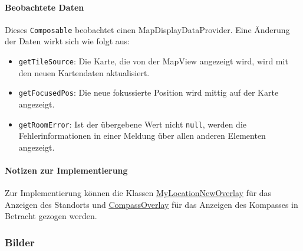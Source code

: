 \paragraph*{Beobachtete Daten}
Dieses \texttt{Composable} beobachtet einen MapDisplayDataProvider. 
Eine Änderung der Daten wirkt sich wie folgt aus:
\begin{itemize}
    \item \texttt{getTileSource}: Die Karte, die von der MapView angezeigt wird, wird mit den neuen 
    Kartendaten aktualisiert.
    \item \texttt{getFocusedPos}: Die neue fokussierte Position wird mittig auf der Karte angezeigt.
    \item \texttt{getRoomError}: Ist der übergebene Wert nicht \texttt{null}, werden die Fehlerinformationen 
    in einer Meldung über allen anderen Elementen angezeigt.
\end{itemize}

\paragraph*{Notizen zur Implementierung}
Zur Implementierung können die Klassen \href{https://osmdroid.github.io/osmdroid/javadocs/osmdroid-android/debug/org/osmdroid/views/overlay/mylocation/MyLocationNewOverlay.html}
{MyLocationNewOverlay} für das Anzeigen des Standorts und \href{https://osmdroid.github.io/osmdroid/javadocs/osmdroid-android/debug/org/osmdroid/views/overlay/compass/CompassOverlay.html}
{CompassOverlay} für das Anzeigen des Kompasses in Betracht gezogen werden.

\subsubsection*{Bilder}\label{App_Map_View_MapScreen_Bilder}
\begin{minipage}{\linewidth}
    \centering
    \begin{minipage}{.49\textwidth}
        \captionsetup[figure]{labelformat=empty}
        \captionsetup[figure]{labelformat=default}
    \end{minipage}
    \begin{minipage}{.49\textwidth}
        \captionsetup[figure]{labelformat=empty}
        \captionsetup[figure]{labelformat=default}
    \end{minipage}
\end{minipage}
